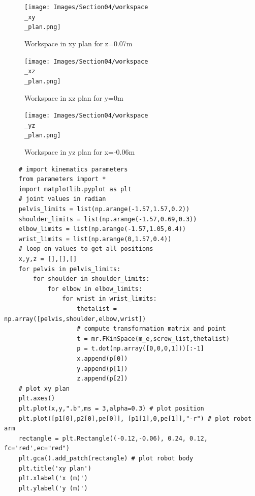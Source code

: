 \begin{figure}[ht]
    \centering
    \texttt{[image: Images/Section04/workspace\\\_xy\\\_plan.png]}
    \caption{Workspace in xy plan for z=0.07m}
    \label{fig:WorkspaceXY}
\end{figure}
\FloatBarrier

\begin{figure}[ht]
    \centering
    \texttt{[image: Images/Section04/workspace\\\_xz\\\_plan.png]}
    \caption{Workspace in xz plan for y=0m}
    \label{fig:WorkspaceXZ}
\end{figure}
\FloatBarrier

\begin{figure}[ht]
    \centering
    \texttt{[image: Images/Section04/workspace\\\_yz\\\_plan.png]}
    \caption{Workspace in yz plan for x=-0.06m }
    \label{fig:WorkspaceYZ}
\end{figure}
\FloatBarrier

\begin{verbatim}
    # import kinematics parameters
    from parameters import * 
    import matplotlib.pyplot as plt
    # joint values in radian
    pelvis_limits = list(np.arange(-1.57,1.57,0.2))
    shoulder_limits = list(np.arange(-1.57,0.69,0.3))
    elbow_limits = list(np.arange(-1.57,1.05,0.4))
    wrist_limits = list(np.arange(0,1.57,0.4))
    # loop on values to get all positions
    x,y,z = [],[],[]
    for pelvis in pelvis_limits:
        for shoulder in shoulder_limits:
            for elbow in elbow_limits:
                for wrist in wrist_limits:
                    thetalist = np.array([pelvis,shoulder,elbow,wrist])
                    # compute transformation matrix and point
                    t = mr.FKinSpace(m_e,screw_list,thetalist)
                    p = t.dot(np.array([0,0,0,1]))[:-1]
                    x.append(p[0])
                    y.append(p[1])
                    z.append(p[2])
    # plot xy plan
    plt.axes()
    plt.plot(x,y,".b",ms = 3,alpha=0.3) # plot position
    plt.plot([p1[0],p2[0],pe[0]], [p1[1],0,pe[1]],"-r") # plot robot arm
    rectangle = plt.Rectangle((-0.12,-0.06), 0.24, 0.12, fc='red',ec="red") 
    plt.gca().add_patch(rectangle) # plot robot body
    plt.title('xy plan')
    plt.xlabel('x (m)')
    plt.ylabel('y (m)')
    \end{verbatim}

